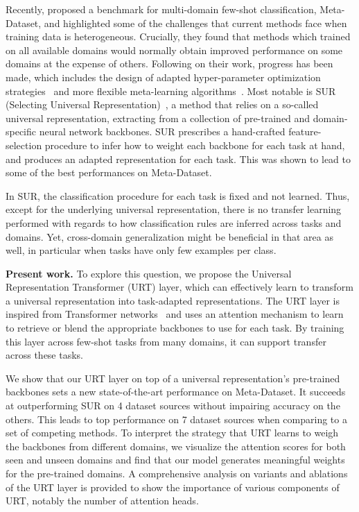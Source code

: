 \documentclass{article}
\begin{document}
Recently, \citet{triantafillou2019meta} proposed a benchmark for multi-domain few-shot classification, Meta-Dataset, and highlighted some of the challenges that current methods face when training data is heterogeneous. Crucially, they found that methods which trained on all available domains would normally obtain improved performance on some domains at the expense of others. Following on their work, progress has been made, which includes the design of adapted hyper-parameter optimization strategies~\cite{saikia2020optimized} and more flexible meta-learning algorithms~\cite{requeima2019fast}. Most notable is SUR (Selecting Universal Representation)~\cite{dvornik2020selecting}, a method that relies on a so-called universal representation, extracting from a collection of pre-trained and domain-specific neural network backbones. SUR prescribes a hand-crafted feature-selection procedure to infer how to weight each backbone for each task at hand, and produces an adapted representation for each task. This was shown to lead to some of the best performances on Meta-Dataset.


In SUR, the classification procedure for each task is fixed and not learned. Thus, except for the underlying universal representation, there is no transfer learning performed with regards to how classification rules are inferred across tasks and domains. Yet, cross-domain generalization might be beneficial in that area as well, in particular when tasks have only few examples per class. 

\textbf{Present work.}
To explore this question, we propose the Universal Representation Transformer (URT) layer, which can effectively learn to transform a universal representation into task-adapted representations. 
The URT layer is inspired from Transformer networks~\cite{vaswani2017attention} and uses an attention mechanism to learn to retrieve or blend the appropriate backbones to use for each task. By training this layer across few-shot tasks from many domains, it can support transfer across these tasks.


We show that our URT layer on top of a universal representation's pre-trained backbones sets a new state-of-the-art performance on Meta-Dataset.
It succeeds at outperforming SUR on 4 dataset sources without impairing accuracy on the others. This leads to top performance on 7 dataset sources when comparing to a set of competing methods.
To interpret the strategy that URT learns to weigh the backbones from different domains, we visualize the attention scores for both seen and unseen domains and find that our model generates meaningful weights for the pre-trained domains. A comprehensive analysis on variants and ablations of the URT layer is provided to show the importance of various components of URT, notably the number of attention heads.
\end{document}
